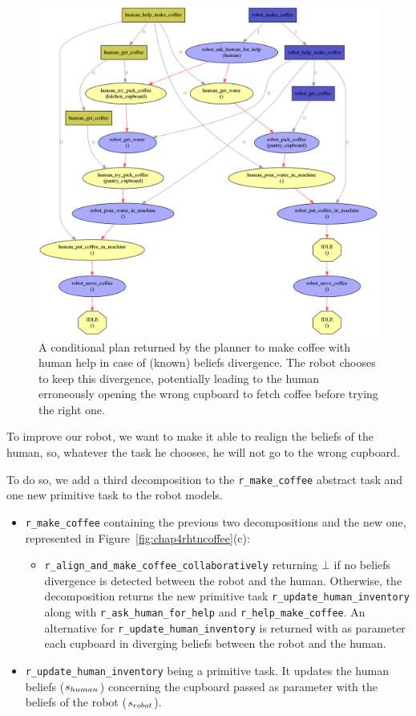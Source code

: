 \documentclass[a4paper,11pt,twoside]{StyleThese}
\begin{document}
\begin{figure}[hbtp]
\centering
\includegraphics[width=\textwidth]{figures/chapter4/Chap4CoopDivergence.png}
\caption{A conditional plan returned by the planner to make coffee with human help in case of (known) beliefs divergence. The robot chooses to keep this divergence, potentially leading to the human erroneously opening the wrong cupboard to fetch coffee before trying the right one.}
\label{fig:chap4beliefsdivnoalign}
\end{figure}

To improve our robot, we want to make it able to realign the beliefs of the human, so, whatever the task he chooses, he will not go to the wrong cupboard. 

To do so, we add a third decomposition to the \verb'r_make_coffee' abstract task and one new primitive task to the robot models.
\begin{itemize}
\item \verb'r_make_coffee' containing the previous two decompositions and the new one, represented in Figure~\ref{fig:chap4rhtncoffee}(c):
	\begin{itemize}
	\item \verb'r_align_and_make_coffee_collaboratively' returning $\bot$ if no beliefs divergence is detected between the robot and the human. Otherwise, the decomposition returns the new primitive task \verb'r_update_human_inventory' along with \verb'r_ask_human_for_help' and \verb'r_help_make_coffee'. An alternative for \verb'r_update_human_inventory' is returned with as parameter each cupboard in diverging beliefs between the robot and the human.
	\end{itemize}
\item \verb'r_update_human_inventory' being a primitive task. It updates the human beliefs ($s_{human}$) concerning the cupboard passed as parameter with the beliefs of the robot ($s_{robot}$).
\end{itemize}
\end{document}
